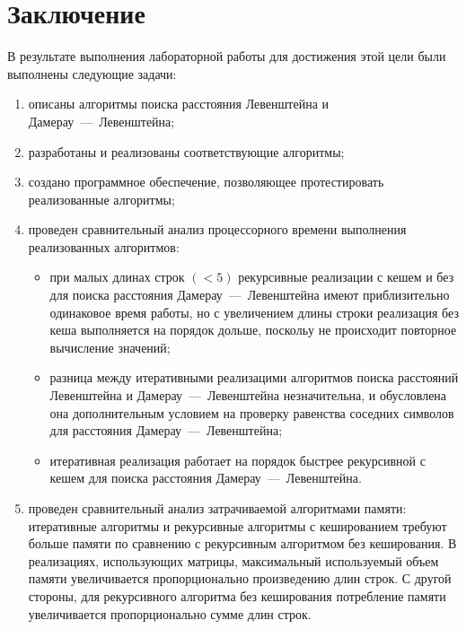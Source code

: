\chapter{Заключение}
В результате выполнения лабораторной работы для достижения этой цели были выполнены следующие задачи:
\begin{enumerate}
    \item описаны алгоритмы поиска расстояния Левенштейна и Дамерау~---~Левенштейна;
    \item разработаны и реализованы соответствующие алгоритмы;
    \item создано программное обеспечение, позволяющее протестировать реализованные алгоритмы;
    \item проведен сравнительный анализ процессорного времени выполнения реализованных алгоритмов:
    \begin{itemize}
        \item при малых длинах строк $(< 5)$ рекурсивные реализации с кешем и без для поиска расстояния Дамерау~---~Левенштейна имеют приблизительно одинаковое время работы, 
	    но с увеличением длины строки реализация без кеша выполняется на порядок дольше, поскольу не происходит повторное вычисление значений;
        \item разница между итеративными реализацими алгоритмов поиска расстояний Левенштейна и Дамерау~---~Левенштейна незначительна, и обусловлена она
        дополнительным условием на проверку равенства соседних символов для расстояния Дамерау~---~Левенштейна;
        \item итеративная реализация работает на порядок быстрее рекурсивной с кешем для поиска расстояния Дамерау~---~Левенштейна.
        \end{itemize}
    \item проведен сравнительный анализ затрачиваемой алгоритмами памяти: итеративные алгоритмы и рекурсивные алгоритмы с кешированием требуют больше памяти по сравнению с рекурсивным алгоритмом без кеширования. 
    В реализациях, использующих матрицы, максимальный используемый объем памяти увеличивается пропорционально произведению длин строк. С другой стороны, для рекурсивного алгоритма без кеширования потребление памяти 
    увеличивается пропорционально сумме длин строк.
\end{enumerate} 